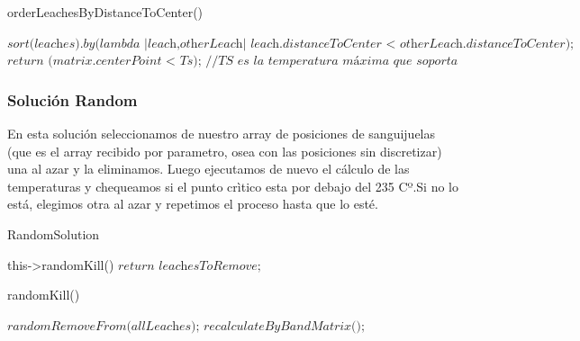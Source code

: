 \begin{algorithm}
\caption{orderLeachesByDistanceToCenter()}\label{euclid}
\begin{algorithmic}[1]
\State $\textit{sort(leaches).by(lambda {|leach,otherLeach| leach.distanceToCenter < otherLeach.distanceToCenter});}$
\State $\textit{return (matrix.centerPoint < Ts); //TS es la temperatura máxima que soporta el centro}$
\end{algorithmic}
\end{algorithm}

\subsubsection{Solución Random}\label{sec:solucionRandom}
En esta solución seleccionamos de nuestro array de posiciones de sanguijuelas (que es el array recibido por parametro, osea con las posiciones sin discretizar) una al azar y la eliminamos. Luego ejecutamos de nuevo el cálculo de las temperaturas y chequeamos si el punto crìtico esta por debajo del 235 Cº.Si no lo está, elegimos otra al azar y repetimos el proceso hasta que lo esté. 

\begin{algorithm}
\caption{RandomSolution}\label{euclid}
\begin{algorithmic}[1]
\Do
    \State this->randomKill()
\State $\textit{return leachesToRemove;}$
\end{algorithmic}
\end{algorithm}

\begin{algorithm}
\caption{randomKill()}\label{euclid}
\begin{algorithmic}[1]
\State $\textit{randomRemoveFrom(allLeaches);}$ 
\State $\textit{recalculateByBandMatrix();}$
\end{algorithmic}
\end{algorithm}


